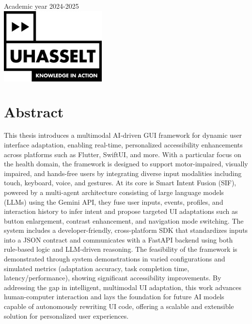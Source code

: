 \documentclass[openany]{book}
\begin{document}
\begin{titlepage}
\vspace*{1cm}


{\large Academic year 2024-2025}\\[2cm]


\includegraphics[width=0.4\textwidth]{Images/uhasselt.jpg}\\
 

\vfill %

\end{titlepage}


\chapter*{Abstract}
This thesis introduces a multimodal AI-driven GUI framework for dynamic user interface adaptation, enabling real-time, personalized accessibility enhancements across platforms such as Flutter, SwiftUI, and more. With a particular focus on the health domain, the framework is designed to support motor-impaired, visually impaired, and hands-free users by integrating diverse input modalities including touch, keyboard, voice, and gestures. At its core is Smart Intent Fusion (SIF), powered by a multi-agent architecture consisting of large language models (LLMs) using the Gemini API, they fuse user inputs, events, profiles, and interaction history to infer intent and propose targeted UI adaptations such as button enlargement, contrast enhancement, and navigation mode switching. The system includes a developer-friendly, cross-platform SDK that standardizes inputs into a JSON contract and communicates with a FastAPI backend using both rule-based logic and LLM-driven reasoning. The feasibility of the framework is demonstrated through system demonstrations in varied configurations and simulated metrics (adaptation accuracy, task completion time, latency/performance), showing significant accessibility improvements. By addressing the gap in intelligent, multimodal UI adaptation, this work advances human-computer interaction and lays the foundation for future AI models capable of autonomously rewriting UI code, offering a scalable and extensible solution for personalized user experiences.
\end{document}
